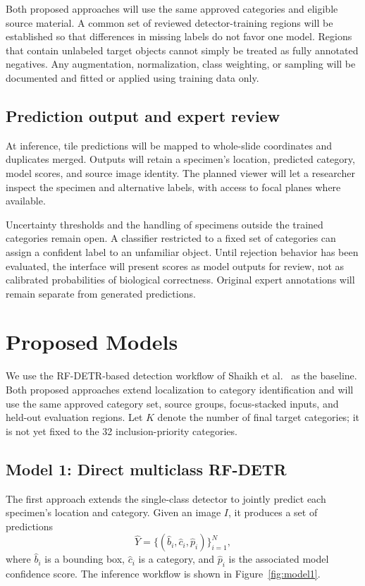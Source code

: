 \documentclass[conference,letterpaper]{IEEEtran}
\begin{document}
Both proposed approaches will use the same approved categories and eligible source material. A common set of reviewed detector-training regions will be established so that differences in missing labels do not favor one model. Regions that contain unlabeled target objects cannot simply be treated as fully annotated negatives. Any augmentation, normalization, class weighting, or sampling will be documented and fitted or applied using training data only.

\subsection{Prediction output and expert review}
At inference, tile predictions will be mapped to whole-slide coordinates and duplicates merged. Outputs will retain a specimen's location, predicted category, model scores, and source image identity. The planned viewer will let a researcher inspect the specimen and alternative labels, with access to focal planes where available.

Uncertainty thresholds and the handling of specimens outside the trained categories remain open. A classifier restricted to a fixed set of categories can assign a confident label to an unfamiliar object. Until rejection behavior has been evaluated, the interface will present scores as model outputs for review, not as calibrated probabilities of biological correctness. Original expert annotations will remain separate from generated predictions.

\section{Proposed Models}
We use the RF-DETR-based detection workflow of Shaikh et al.\ \cite{shaikh2026} as the baseline. Both proposed approaches extend localization to category identification and will use the same approved category set, source groups, focus-stacked inputs, and held-out evaluation regions. Let $K$ denote the number of final target categories; it is not yet fixed to the 32 inclusion-priority categories.

\subsection{Model 1: Direct multiclass RF-DETR}
The first approach extends the single-class detector to jointly predict each specimen's location and category. Given an image $I$, it produces a set of predictions
\[
\widehat{Y}=\{(\widehat{b}_i,\widehat{c}_i,\widehat{p}_i)\}_{i=1}^{N},
\]
where $\widehat{b}_i$ is a bounding box, $\widehat{c}_i$ is a category, and $\widehat{p}_i$ is the associated model confidence score. The inference workflow is shown in Figure~\ref{fig:model1}.
\end{document}
